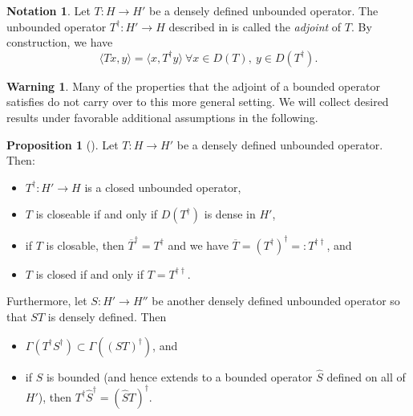 \documentclass{article}
\numberwithin{equation}{section}
\theoremstyle{definition}
\newtheorem{proposition}[definition]{Proposition}
\newtheorem{warning}[definition]{Warning}
\newtheorem{notation}[definition]{Notation}
\theoremstyle{theorem}
\begin{document}
\begin{notation}
    Let $T \colon H \to H'$ be a densely defined unbounded operator. The unbounded operator  $T^\dagger \colon H' \to H$ described in 
     is called the \emph{adjoint} of $T$. By construction, we have 
    \begin{equation}\label{Equation: adjunction equation for unbounded operators}
        \langle Tx, y \rangle = \langle x, T^\dagger y\rangle \ \forall x \in D(T), \ y \in D(T^\dagger).
    \end{equation}
\end{notation}
\begin{warning}
    Many of the properties that the adjoint of a bounded operator satisfies do not carry over to this more general setting. 
    We will collect desired results under favorable additional assumptions in the following.
\end{warning}
\begin{proposition}[{\cite[Propositions 1.6 \& 1.7 and Theorem 1.8]{Schmuedgen2012unbounded}}]\label{Proposition: properties of the adjoint operator}
    Let $T \colon H \to H'$ be a densely defined unbounded operator. Then: 
    \begin{itemize}
        \item[(i)] $T^\dagger \colon H' \to H$ is a closed unbounded operator, 
        \item[(ii)] $T$ is closeable if and only if $D(T^\dagger)$ is dense in $H'$,
        \item[(iii)] if $T$ is closable, then $\overline{T}^\dagger = T^\dagger$ and we have $\overline{T} = (T^\dagger)^\dagger =: T^{\dagger \dagger}$, and 
        \item[(iv)] $T$ is closed if and only if $T = T^{\dagger \dagger}$. 
    \end{itemize}
    Furthermore, let $S \colon H' \to H''$ be another densely defined unbounded operator so that $ST$ is densely defined. Then 
    \begin{itemize}
        \item[(v)] $\Gamma(T^\dagger S^\dagger) \subset \Gamma((ST)^\dagger)$, and 
        \item[(vi)] if $S$ is bounded (and hence extends to a bounded operator $\hat{S}$ defined on all of $H'$), 
            then $T^\dagger \hat{S}^\dagger = (\hat{S}T)^\dagger$. 
    \end{itemize}
\end{proposition}
\end{document}
